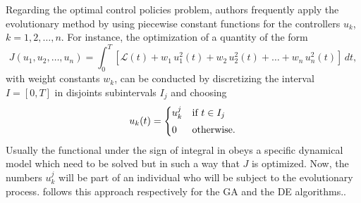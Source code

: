   Regarding the optimal control policies problem, authors frequently apply the 
evolutionary method by using piecewise constant functions for the controllers 
$u_k$, $k=1,2,\dots,n$. For instance, the optimization of a
quantity of the form
\begin{equation}
  J(u_1,u_2,\dots,u_n) = \int_0^T{\left[ \mathcal{L}(t) + w_1\,u_1^2(t) + 
  w_2\,u_2^2(t)+\dots + w_n\,u_n^2(t) \right]\,dt},
\label{eq:Jaccion}
\end{equation}
with weight constants $w_k$, can be conducted by discretizing the 
interval $I = [0,T]$ in disjoints subintervals $I_j$ and choosing  
\begin{equation}\label{DECrossover}
  u_{k}(t) =
  \begin{cases}
    u^j_{k} & \text{if $t \in I_j$}
      \vspace*{0.1cm}\\
      0 & \text{otherwise.}
  \end{cases}
\end{equation}
  Usually the functional under the sign of integral in 
obeys a specific dynamical model which need to be solved but in such a way
that $J$ is optimized. Now, the numbers $u^j_{k}$ will be part of an 
individual who will be subject to the evolutionary process. 
\citet{Yan2008,Jang2018} follows this approach respectively for the GA and the 
DE algorithms..



